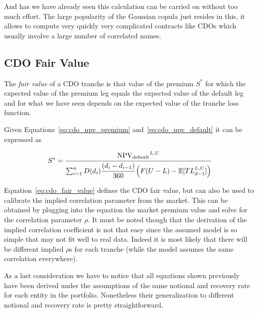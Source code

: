 And has we have already seen this calculation can be carried on without too much effort. The large popularity of the Gaussian copula just resides in this, it allows to compute very quickly very complicated contracts like CDOs which usually involve a large number of correlated names.

\subsection{CDO Fair Value}
The \emph{fair value} of a CDO tranche is that value of the premium $S^*$ for which the expected value of the premium leg equals the expected value of the default leg and for what we have seen depends on the expected value of the tranche loss function.

Given Equations~\ref{eq:cdo_npv_premium} and~\ref{eq:cdo_npv_default} it can be expressed as

\begin{equation}
S^* = \cfrac{\mathrm{NPV_{default}}^{L,U}}{\sum^{n}_{i=1}D(d_i)\cfrac{(d_i - d_{i-1})}{360}\left(F(U-L)-\mathbb{E}[TL_{d-1}^{L,U}]\right)}
\label{eq:cdo_fair_value}
\end{equation}

Equation~\ref{eq:cdo_fair_value} defines the CDO fair value, but can also be used to calibrate the implied correlation parameter from the market. This can be obtained by plugging into the equation the market premium value and solve for the correlation parameter $\rho$. It must be noted though that the derivation of the implied correlation coefficient is not that easy since the assumed model is so simple that may not fit well to real data. Indeed it is most likely that there will be different implied $\rho$s for each tranche (while the model assumes the same correlation everywhere).

As a last consideration we have to notice that all equations shown previously have been derived under the assumptions of the same notional and recovery rate for each entity in the portfolio. Nonetheless their generalization to different notional and recovery rate is pretty straightforward.
 
%

